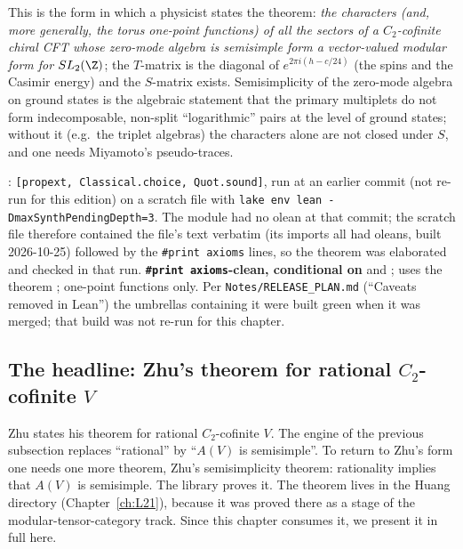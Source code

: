 \begin{physics}
This is the form in which a physicist states the theorem: \emph{the characters (and, more generally, the torus one-point
functions) of all the sectors of a $C_2$-cofinite chiral CFT whose zero-mode algebra is semisimple form a vector-valued
modular form for $\lfifteenSL$}; the $T$-matrix is the diagonal of $e^{2\pi i(h-c/24)}$ (the spins and the Casimir energy) and
the $S$-matrix exists. Semisimplicity of the zero-mode algebra on ground states is the algebraic statement that the
primary multiplets do not form indecomposable, non-split ``logarithmic'' pairs at the level of ground states; without it
(e.g.\ the triplet algebras) the characters alone are not closed under $S$, and one needs Miyamoto's pseudo-traces.
\end{physics}

\begin{status}
\allowbreak{}\allowbreak{}:
\texttt{[propext, Classical.choice, Quot.sound]}, run at an earlier commit (not re-run for this edition) on a scratch file with \texttt{lake env lean
-DmaxSynthPendingDepth=3}. The module  had no olean at that commit; the scratch file
therefore contained the file's text verbatim (its imports all had oleans, built 2026-10-25) followed by the
\texttt{\#print axioms} lines, so the theorem was elaborated and checked in that run. \textbf{\texttt{\#print
axioms}-clean, conditional on}  and ; uses the theorem ; one-point
functions only. Per \texttt{Notes/RELEASE\_PLAN.md} (``Caveats removed in Lean'') the umbrellas containing it were built
green when it was merged; that build was not re-run for this chapter.
\end{status}

\subsection{The headline: Zhu's theorem for rational \texorpdfstring{$C_2$}{C2}-cofinite \texorpdfstring{$V$}{V}}\label{l15:sec:rational}

Zhu states his theorem for rational $C_2$-cofinite $V$. The engine of the previous subsection replaces ``rational'' by
``$A(V)$ is semisimple''. To return to Zhu's form one needs one more theorem, Zhu's semisimplicity theorem: rationality
implies that $A(V)$ is semisimple. The library proves it. The theorem lives in the Huang directory (Chapter~\ref{ch:L21}),
because it was proved there as a stage of the modular-tensor-category track. Since this chapter consumes it, we present it in
full here.

